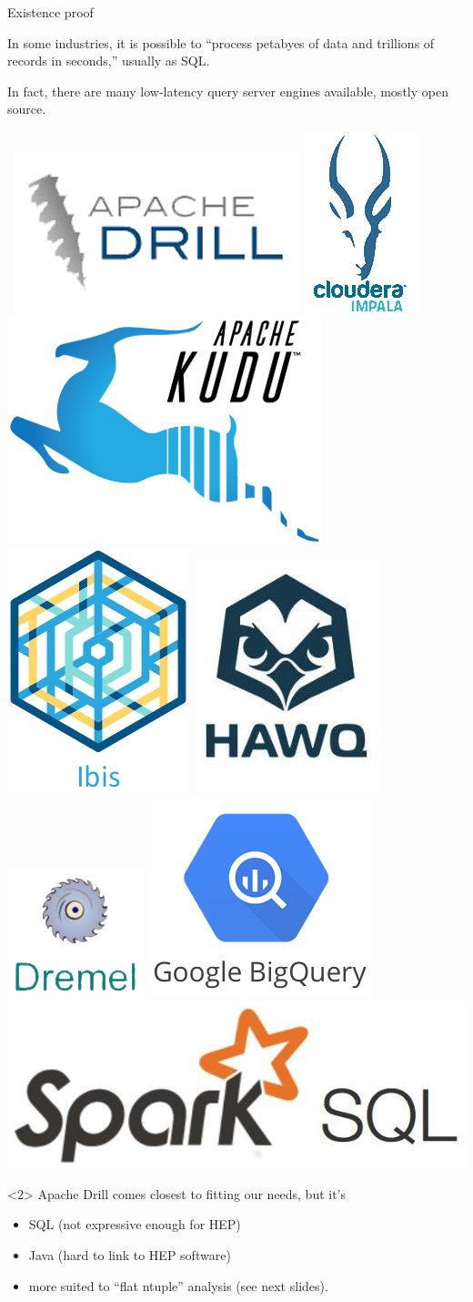 \documentclass{beamer}
\begin{document}
\begin{frame}{Existence proof}

In some industries, it is possible to ``process petabyes of data and trillions of records in seconds\footnotemark[1],'' usually as SQL.

\vspace{0.2 cm}
In fact, there are many low-latency query server engines available, mostly open source.

\vspace{0.5 cm}
\mbox{\hspace{-1 cm}
\includegraphics[height=1.23 cm]{drill-logo.png}
\includegraphics[height=1.23 cm]{impala-logo.png}
\includegraphics[height=1.23 cm]{kudu-logo.png}
\includegraphics[height=1.23 cm]{ibis-logo.png}
\includegraphics[height=1.23 cm]{hawk-logo.png}
\includegraphics[height=1.23 cm]{dremel-logo.png}
\includegraphics[height=1.23 cm]{bigquery-logo.png}
\includegraphics[height=1.23 cm]{sparksql-logo.png}}

\vspace{0.5 cm}
\begin{uncoverenv}<2>
Apache Drill comes closest to fitting our needs, but it's
\begin{itemize}
\item SQL (not expressive enough for HEP)
\item Java (hard to link to HEP software)
\item more suited to ``flat ntuple'' analysis (see next slides).
\end{itemize}
\end{uncoverenv}

\end{frame}
\end{document}
